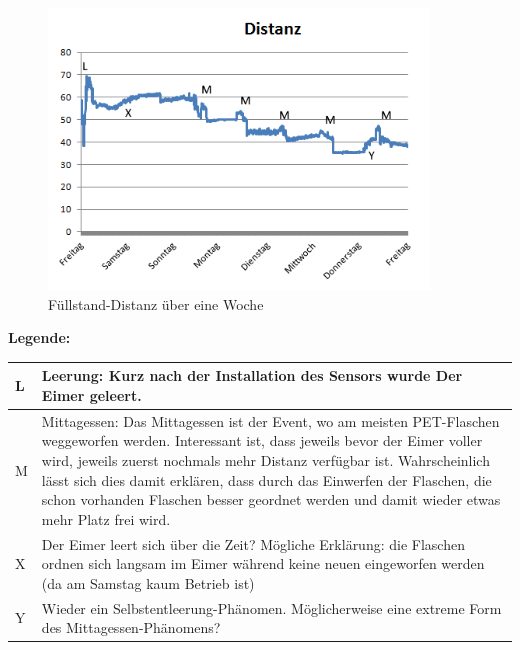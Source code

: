 \begin{figure}[H]
     \centering
        \includegraphics[width=0.9\textwidth]{pictures/Distance-Statistics.png}
    \caption{Füllstand-Distanz über eine Woche}
    \label{fig:Distance-Statistics}
\end{figure}

\textbf{Legende:}
\begin{table}[H]
\begin{tabulary}{\paperwidth}{m{0.08cm} m{15cm}}
L & Leerung: Kurz nach der Installation des Sensors wurde Der Eimer geleert. \\ \hline
M & Mittagessen: Das Mittagessen ist der Event, wo am meisten PET-Flaschen weggeworfen werden. Interessant ist, dass jeweils bevor der Eimer voller wird, jeweils zuerst nochmals mehr Distanz verfügbar ist. Wahrscheinlich lässt sich dies damit erklären, dass durch das Einwerfen der Flaschen, die schon vorhanden Flaschen besser geordnet werden und damit wieder etwas mehr Platz frei wird. \\ \hline
X & Der Eimer leert sich über die Zeit? Mögliche Erklärung: die Flaschen \glqq{}ordnen\grqq{} sich langsam im Eimer während keine neuen eingeworfen werden (da am Samstag kaum Betrieb ist) \\ \hline
Y & Wieder ein \glqq{}Selbstentleerung-Phänomen\grqq{}. Möglicherweise eine extreme Form des Mittagessen-Phänomens?
\end{tabulary}
\end{table}

